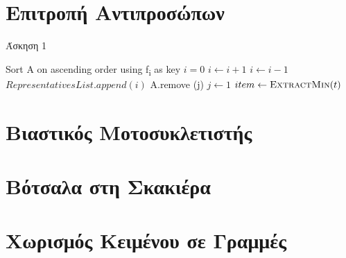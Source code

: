 \documentclass[a4paper,11pt]{book}
\begin{document}
\renewcommand{\labelenumi}{\roman{enumi})}
\renewcommand{\labelenumii}{(\arabic{enumii})}



\section{Επιτροπή Αντιπροσώπων} \setcounter{section}{1}

\begin{algorithm}[H]
\caption{Άσκηση 1}
\begin{algorithmic}[1]
    \State Sort A on ascending order using f\textsubscript{i} as key
    \State $i = 0$
        \State $i \gets i+1$
    \EndWhile
    \State $i \gets i-1$
    \State $RepresentativesList.append (i)$
	A.remove (j)
    \EndFor
    \State $j \gets 1$
        \State $item \gets \Call{ExtractMin}{t}$
    \EndWhile
\EndProcedure
\end{algorithmic}
\end{algorithm}



\vspace{3cm}

\section{Βιαστικός Μοτοσυκλετιστής}


\vspace{3cm}

\section{Βότσαλα στη Σκακιέρα}


\vspace{3cm}

\section{Χωρισμός Κειμένου σε Γραμμές}


\vspace{3cm}
\end{document}
